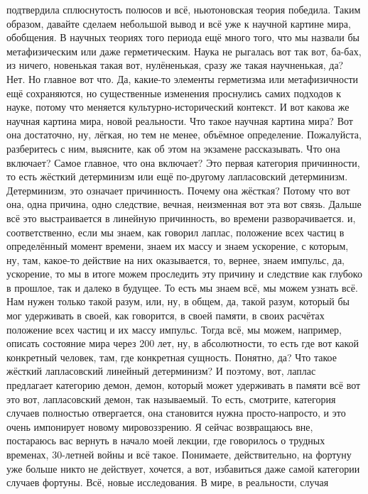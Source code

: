 подтвердила сплюснутость полюсов и всё, ньютоновская теория победила. Таким
образом, давайте сделаем небольшой вывод и всё уже к научной картине мира,
обобщения. В научных теориях того периода ещё много того, что мы назвали бы
метафизическим или даже герметическим. Наука не рыгалась вот так вот, ба-бах, из
ничего, новенькая такая вот, нулёненькая, сразу же такая научненькая, да? Нет.
Но главное вот что. Да, какие-то элементы герметизма или метафизичности ещё
сохраняются, но существенные изменения проснулись самих подходов к науке, потому
что меняется культурно-исторический контекст. И вот какова же научная картина
мира, новой реальности. Что такое научная картина мира? Вот она достаточно, ну,
лёгкая, но тем не менее, объёмное определение. Пожалуйста, разберитесь с ним,
выясните, как об этом на экзамене рассказывать. Что она включает? Самое главное,
что она включает? Это первая категория причинности, то есть жёсткий детерминизм
или ещё по-другому лапласовский детерминизм. Детерминизм, это означает
причинность. Почему она жёсткая? Потому что вот она, одна причина, одно
следствие, вечная, неизменная вот эта вот связь. Дальше всё это выстраивается в
линейную причинность, во времени разворачивается. и, соответственно, если мы
знаем, как говорил лаплас, положение всех частиц в определённый момент времени,
знаем их массу и знаем ускорение, с которым, ну, там, какое-то действие на них
оказывается, то, вернее, знаем импульс, да, ускорение, то мы в итоге можем
проследить эту причину и следствие как глубоко в прошлое, так и далеко в
будущее. То есть мы знаем всё, мы можем узнать всё. Нам нужен только такой
разум, или, ну, в общем, да, такой разум, который бы мог удерживать в своей, как
говорится, в своей памяти, в своих расчётах положение всех частиц и их массу
импульс. Тогда всё, мы можем, например, описать состояние мира через 200 лет,
ну, в абсолютности, то есть где вот какой конкретный человек, там, где
конкретная сущность. Понятно, да? Что такое жёсткий лапласовский линейный
детерминизм? И поэтому, вот, лаплас предлагает категорию демон, демон, который
может удерживать в памяти всё вот это вот, лапласовский демон, так называемый.
То есть, смотрите, категория случаев полностью отвергается, она становится нужна
просто-напросто, и это очень импонирует новому мировоззрению. Я сейчас
возвращаюсь вне, постараюсь вас вернуть в начало моей лекции, где говорилось о
трудных временах, 30-летней войны и всё такое. Понимаете, действительно, на
фортуну уже больше никто не действует, хочется, а вот, избавиться даже самой
категории случаев фортуны. Всё, новые исследования. В мире, в реальности, случая
